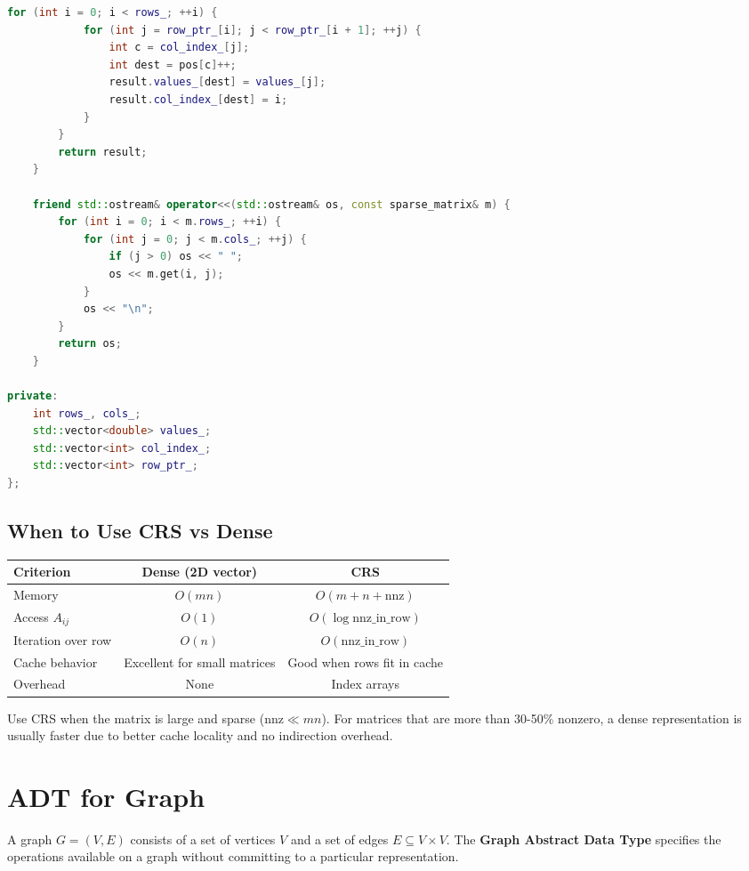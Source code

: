\begin{lstlisting}[language=C++]
        for (int i = 0; i < rows_; ++i) {
            for (int j = row_ptr_[i]; j < row_ptr_[i + 1]; ++j) {
                int c = col_index_[j];
                int dest = pos[c]++;
                result.values_[dest] = values_[j];
                result.col_index_[dest] = i;
            }
        }
        return result;
    }

    friend std::ostream& operator<<(std::ostream& os, const sparse_matrix& m) {
        for (int i = 0; i < m.rows_; ++i) {
            for (int j = 0; j < m.cols_; ++j) {
                if (j > 0) os << " ";
                os << m.get(i, j);
            }
            os << "\n";
        }
        return os;
    }

private:
    int rows_, cols_;
    std::vector<double> values_;
    std::vector<int> col_index_;
    std::vector<int> row_ptr_;
};
\end{lstlisting}

\subsection{When to Use CRS vs Dense}

\begin{center}
\begin{tabular}{lcc}
\toprule
Criterion & Dense (2D vector) & CRS \\
\midrule
Memory & $O(mn)$ & $O(m + n + \text{nnz})$ \\
Access $A_{ij}$ & $O(1)$ & $O(\log \text{nnz\_in\_row})$ \\
Iteration over row & $O(n)$ & $O(\text{nnz\_in\_row})$ \\
Cache behavior & Excellent for small matrices & Good when rows fit in cache \\
Overhead & None & Index arrays \\
\bottomrule
\end{tabular}
\end{center}

Use CRS when the matrix is large and sparse ($\text{nnz} \ll mn$). For matrices that are more than 30-50\% nonzero, a dense representation is usually faster due to better cache locality and no indirection overhead.

\section{ADT for Graph}

A graph $G = (V, E)$ consists of a set of vertices $V$ and a set of edges $E \subseteq V \times V$. The \textbf{Graph Abstract Data Type} specifies the operations available on a graph without committing to a particular representation.

